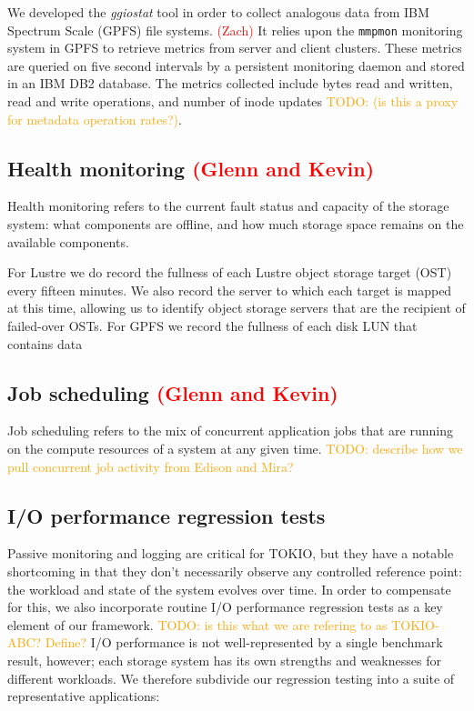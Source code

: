 \documentclass[conference,10pt,compsocconf]{IEEEtran}
\newcommand{\assign}[1]{\textcolor{red}{(#1)}}
\newcommand{\todo}[1]{\textcolor{Orange}{TODO: #1}}
\begin{document}
\label{sec:methods/ggiostat}
We developed the \emph{ggiostat} tool in order to collect analogous data from
IBM Spectrum Scale (GPFS) file systems.  \assign{Zach}  It relies upon the
\texttt{mmpmon} monitoring system in GPFS to retrieve metrics from server and
client clusters.  These metrics are queried on five second intervals by a
persistent monitoring daemon and stored in an IBM DB2 database.
The metrics collected include bytes read and written,
read and write operations, and number of inode updates \todo{(is this
a proxy for metadata operation rates?)}.

\subsection{Health monitoring \assign{Glenn and Kevin}}
\label{sec:methods/health}

Health monitoring refers to the current fault status and capacity of the
storage system: what components are offline, and how much storage space
remains on the available components.

For Lustre we do record the fullness of each Lustre object storage target (OST) every fifteen minutes.  We also record the server to which each target is mapped at this time, allowing us to identify object storage servers that are the recipient of failed-over OSTs.  For GPFS we record the fullness of each disk LUN that contains data

\subsection{Job scheduling \assign{Glenn and Kevin}}

Job scheduling refers to the mix of concurrent application jobs that are
running on the compute resources of a system at any given time.
\todo{describe how we pull concurrent job activity from Edison and Mira?}

\subsection{I/O performance regression tests} \label{sec:methods/tests}

Passive monitoring and logging are critical for TOKIO, but they have a
notable shortcoming in that they don't necessarily observe any controlled
reference point: the workload and state of the system evolves over time.  In
order to compensate for this, we also incorporate routine I/O performance
regression tests as a key element of our framework.
\todo{is this what we are refering to as TOKIO-ABC?  Define?}  I/O
performance is not well-represented by a single benchmark result, however;
each storage system has its own strengths and weaknesses for different
workloads.  We therefore subdivide our regression testing into a suite of
representative applications:
\end{document}
